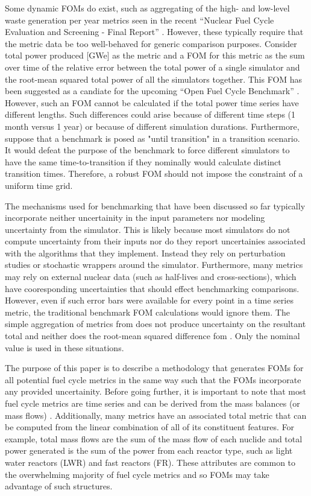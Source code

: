 Some dynamic FOMs do exist, such as aggregating of the high- and low-level
waste generation per year metrics seen in the recent 
``Nuclear Fuel Cycle Evaluation and Screening - Final Report'' 
\cite{wigeland2014nuclear}. However, these typically require that the metric
data be too well-behaved for generic comparison purposes. Consider  
total power produced [GWe] as the metric and a FOM for this metric as 
the sum over time of the relative error 
between the total power of a single simulator and the root-mean squared 
total power of all the simulators together. This FOM has been suggested as
a candiate for the upcoming ``Open Fuel Cycle Benchmark'' 
\cite{mouginot2015ofcb}. However, such an FOM cannot be calculated 
if the total power
time series have different lengths. Such differences could arise because 
of different time steps (1 month versus 1 year) or because of different 
simulation durations. Furthermore, suppose that a benchmark is posed as 
"until transition" in a transition scenario. It would defeat the purpose of 
the benchmark to force different simulators to have the same 
time-to-transition if they nominally would calculate distinct transition 
times. Therefore, a robust FOM should not impose the constraint of a uniform time grid.
 
The mechanisms used for benchmarking that have been discussed so far typically
incorporate neither uncertainity in the input parameters nor 
modeling uncertainty from the simulator.
This is likely because most simulators do not compute uncertainty from their
inputs nor do they report uncertainies associated with the algorithms that 
they implement. 
Instead they rely on perturbation studies or stochastic wrappers around 
the simulator. Furthermore, many metrics may rely on external nuclear 
data (such as half-lives and cross-sections), which have cooresponding 
uncertainties that should effect benchmarking comparisons. 
However, even if such error bars were available for
every point in a time series metric, the traditional benchmark FOM 
calculations would ignore them. The simple aggregation of metrics from 
\cite{wigeland2014nuclear} does not produce uncertainty on the resultant
total and neither does the root-mean squared difference fom 
\cite{mouginot2015ofcb}. Only the nominal value is used in these situations.

The purpose of this paper is to describe a methodology that generates FOMs
for all potential fuel cycle metrics in the same way such that the FOMs 
incorporate any provided uncertainity. 
Before going further, it is important to note that 
most fuel cycle 
metrics are time series and can be derived from the mass balances (or 
mass flows) \cite{wilson2011comparing,guerin2009benchmark,piet2011assessment,wigeland2014nuclear}. 
Additionally, many metrics have an associated total metric that can be 
computed from the linear combination of all of its constituent features. 
For example, total mass flows are the sum of the mass flow of each nuclide
and total power generated is the sum of the power from each reactor type, 
such as light water reactors (LWR) and fast reactors (FR). These attributes 
are common to the overwhelming majority of fuel cycle metrics and so FOMs
may take advantage of such structures.

